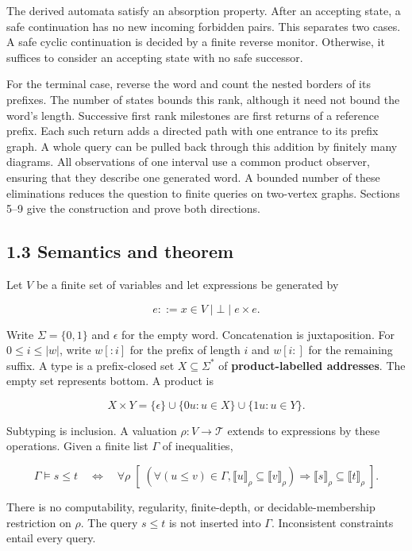 \documentclass[
  11pt,
  a4paper,
]{article}
\begin{document}
The derived automata satisfy an absorption property. After an accepting
state, a safe continuation has no new incoming forbidden pairs. This
separates two cases. A safe cyclic continuation is decided by a finite
reverse monitor. Otherwise, it suffices to consider an accepting state
with no safe successor.

For the terminal case, reverse the word and count the nested borders of
its prefixes. The number of states bounds this rank, although it need
not bound the word's length. Successive first rank milestones are first
returns of a reference prefix. Each such return adds a directed path
with one entrance to its prefix graph. A whole query can be pulled back
through this addition by finitely many diagrams. All observations of one
interval use a common product observer, ensuring that they describe one
generated word. A bounded number of these eliminations reduces the
question to finite queries on two-vertex graphs. Sections 5--9 give the
construction and prove both directions.

\subsection{1.3 Semantics and theorem}\label{semantics-and-theorem}

Let \(V\) be a finite set of variables and let expressions be generated
by

\[e ::= x\in V\mid\bot\mid e\times e.\]

Write \(\Sigma=\{0,1\}\) and \(\epsilon\) for the empty word.
Concatenation is juxtaposition. For \(0\le i\le |w|\), write \(w[:i]\)
for the prefix of length \(i\) and \(w[i:]\) for the remaining suffix. A
type is a prefix-closed set \(X\subseteq\Sigma^*\) of
\textbf{product-labelled addresses}. The empty set represents bottom. A
product is

\[X\times Y=\{\epsilon\}\cup\{0u:u\in X\}\cup\{1u:u\in Y\}.\]

Subtyping is inclusion. A valuation \(\rho:V\to\mathcal T\) extends to
expressions by these operations. Given a finite list \(\Gamma\) of
inequalities,

\[\Gamma\models s\le t
\quad\Longleftrightarrow\quad
\forall\rho\;[\;(\forall(u\le v)\in\Gamma,
\llbracket u\rrbracket_\rho\subseteq\llbracket v\rrbracket_\rho)
\Rightarrow
\llbracket s\rrbracket_\rho\subseteq\llbracket t\rrbracket_\rho\;].\]

There is no computability, regularity, finite-depth, or
decidable-membership restriction on \(\rho\). The query \(s\le t\) is
not inserted into \(\Gamma\). Inconsistent constraints entail every
query.
\end{document}
